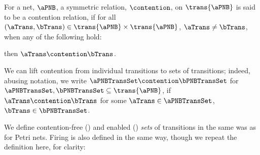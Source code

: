 \begin{definition}\label{defn:contentionRelation}
    For a net, $\aPNB$, a symmetric relation, $\contention$, on
    $\trans{\aPNB}$ is said to be a contention relation, if for all $(\aTrans,
    \bTrans) \in \trans{\aPNB} \times \trans{\aPNB}$, $\aTrans \neq \bTrans$,
    when any of the following hold:

    then $\aTrans \contention \bTrans$.
\end{definition}

We can lift contention from individual transitions to sets of transitions; indeed, abusing
notation, we write $\aPNBTransSet \contention \bPNBTransSet$ for $\aPNBTransSet, \bPNBTransSet
\subseteq \trans{\aPNB}$, if $\aTrans \contention \bTrans$ for some $\aTrans \in \aPNBTransSet$,
$\bTrans\in \bPNBTransSet$.

We define contention-free () and enabled
() \emph{sets} of transitions in the same was as
for Petri nets. Firing is also defined in the same way, though we repeat the
definition here, for clarity:

